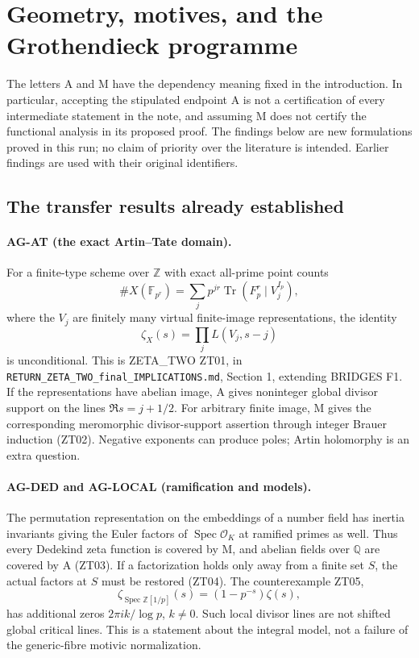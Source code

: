 \section{Geometry, motives, and the Grothendieck programme}
\label{sec:geometry}

The letters A and M have the dependency meaning fixed in the introduction.
In particular, accepting the stipulated endpoint A is not a certification of
every intermediate statement in the note, and assuming M does not certify
the functional analysis in its proposed proof. The findings below are new
formulations proved in this run; no claim of priority over the literature is
intended. Earlier findings are used with their original identifiers.

\subsection{The transfer results already established}
\label{ag:transfer}

\paragraph{AG-AT (the exact Artin--Tate domain).}
For a finite-type scheme over $\mathbb Z$ with exact all-prime point counts
\[
 \#X(\mathbb F_{p^r})=
 \sum_j p^{jr}\operatorname{Tr}(F_p^r\mid V_j^{I_p}),
\]
where the $V_j$ are finitely many virtual finite-image representations,
the identity
\[
 \zeta_X(s)=\prod_j L(V_j,s-j)
\]
is unconditional. This is ZETA\_TWO ZT01, in
\texttt{RETURN\_ZETA\_TWO\_final\_IMPLICATIONS.md}, Section 1,
extending BRIDGES F1. If the representations have abelian image, A gives
noninteger global divisor support on the lines $\Re s=j+1/2$.
For arbitrary finite image, M gives the corresponding meromorphic
divisor-support assertion through integer Brauer induction (ZT02).
Negative exponents can produce poles; Artin holomorphy is an extra question.

\paragraph{AG-DED and AG-LOCAL (ramification and models).}
The permutation representation on the embeddings of a number field has
inertia invariants giving the Euler factors of $\operatorname{Spec}\mathcal
O_K$ at ramified primes as well. Thus every Dedekind zeta function is covered
by M, and abelian fields over $\mathbb Q$ are covered by A (ZT03).
If a factorization holds only away from a finite set $S$, the actual factors
at $S$ must be restored (ZT04). The counterexample ZT05,
\[
 \zeta_{\operatorname{Spec}\mathbb Z[1/p]}(s)
       =(1-p^{-s})\zeta(s),
\]
has additional zeros $2\pi i k/\log p$, $k\ne0$. Such local divisor lines
are not shifted global critical lines. This is a statement about the
integral model, not a failure of the generic-fibre motivic normalization.

